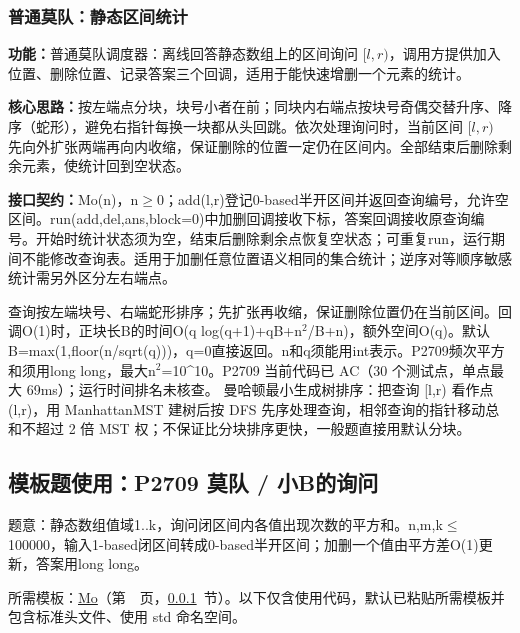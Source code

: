\subsubsection{普通莫队：静态区间统计}\label{compact-Mo}

\noindent\textbf{功能：}\allowbreak 普通莫队调度器：离线回答静态数组上的区间询问 $[l,r)$，调用方提供加入位置、删除位置、记录答案三个回调，适用于能快速增删一个元素的统计。

\textbf{核心思路：}\allowbreak 按左端点分块，块号小者在前；同块内右端点按块号奇偶交替升序、降序（蛇形），避免右指针每换一块都从头回跳。依次处理询问时，当前区间 $[l,r)$ 先向外扩张两端再向内收缩，保证删除的位置一定仍在区间内。全部结束后删除剩余元素，使统计回到空状态。





\newpage

{\sloppy{}\noindent\textbf{接口契约：}Mo(n)，n$\ge$0；add(l,r)登记0-based半开区间并返回查询编号，允许空区间。run(add,del,ans,block=0)中加删回调接收下标，答案回调接收原查询编号。开始时统计状态须为空，结束后删除剩余点恢复空状态；可重复run，运行期间不能修改查询表。适用于加删任意位置语义相同的集合统计；逆序对等顺序敏感统计需另外区分左右端点。

查询按左端块号、右端蛇形排序；先扩张再收缩，保证删除位置仍在当前区间。回调O(1)时，正块长B的时间O(q log(q+1)+qB+n$^{2}$/B+n)，额外空间O(q)。默认B=max(1,floor(n/sqrt(q)))，q=0直接返回。n和q须能用int表示。P2709频次平方和须用long long，最大n$^{2}$=10\textasciicircum{}10。P2709 当前代码已 AC（30 个测试点，单点最大 69ms）；运行时间排名未核查。 曼哈顿最小生成树排序：把查询 [l,r) 看作点 (l,r)，用 ManhattanMST 建树后按 DFS 先序处理查询，相邻查询的指针移动总和不超过 2 倍 MST 权；不保证比分块排序更快，一般题直接用默认分块。\par}

\Needspace{546pt}

\subsection*{模板题使用：P2709 莫队 / 小B的询问}

\label{usage-example-394}

题意：静态数组值域1..k，询问闭区间内各值出现次数的平方和。n,m,k$\le$100000，输入1-based闭区间转成0-based半开区间；加删一个值由平方差O(1)更新，答案用long long。

所需模板：\hyperref[compact-Mo]{Mo}（第~\pageref{compact-Mo}~页，\ref{compact-Mo}~节）。以下仅含使用代码，默认已粘贴所需模板并包含标准头文件、使用 std 命名空间。

